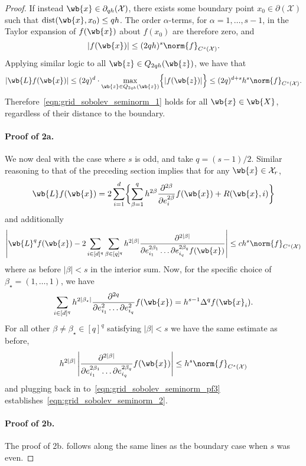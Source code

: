 \documentclass{article}
\newcommand{\abs}[1]{\left \lvert #1 \right \rvert}
\newcommand{\1}{\mathbf{1}}
\newcommand{\Xset}{\mathcal{X}}
\theoremstyle{alden}
\theoremstyle{aldenthm}
\theoremstyle{definition}
\theoremstyle{remark}
\begin{document}
\begin{proof}
	If instead $\wb{x} \in \partial_{qh}(\Xset)$, there exists some boundary point $x_0 \in \partial(\Xset)$ such that $\mathrm{dist}(\wb{x},x_0) \leq qh$. The order $\alpha$-terms, for $\alpha = 1,\ldots,s-1$, in the Taylor expansion of ${f}(\wb{x})$ about $f(x_0)$ are therefore zero, and
	\begin{equation*}
	\abs{f(\wb{x})} \leq (2qh)^s \norm{f}_{C^s(\Xset)}.
	\end{equation*}
	Applying similar logic to all $\wb{z} \in Q_{2qh}(\wb{z})$, we have that
	\begin{equation*}
	\abs{\wb{L}f(\wb{x})} \leq (2q)^d \cdot \max_{\wb{z} \in Q_{2qh}(\wb{z})} \Bigl\{\abs{f(\wb{z})}\Bigr\} \leq (2q)^{d + s} h^s \norm{f}_{C^s(\Xset)}.
	\end{equation*}
	Therefore~\eqref{eqn:grid_sobolev_seminorm_1} holds for all $\wb{x} \in \wb{X}$, regardless of their distance to the boundary.
	
	\paragraph{Proof of 2a.}
	We now deal with the case where $s$ is odd, and take $q = (s - 1)/2$. Similar reasoning to that of the preceding section implies that for any $\wb{x} \in \Xset_r$,
	\begin{equation*}
	\wb{L}f(\wb{x}) =  2\sum_{i = 1}^{d} \biggl\{\sum_{\beta = 1}^{q} h^{2\beta}\frac{\partial^{2\beta}}{\partial e_i^{2\beta}}f(\wb{x}) + R(\wb{x},i)\biggr\}
	\end{equation*}
	and additionally
	\begin{equation}
	\label{eqn:grid_sobolev_seminorm_pf3}
	\abs{\wb{L}^qf(\wb{x}) - 2 \sum_{i \in [d]^q} \sum_{\beta \in [q]^q} h^{2\abs{\beta}} \frac{\partial^{2\abs{\beta}}}{\partial e_{i_1}^{2\beta_1}\ldots \partial e_{i_q}^{2\beta_q} f(\wb{x})} } \leq c h^s\norm{f}_{C^s(\Xset)}
	\end{equation}
	where as before $\abs{\beta} < s$ in the interior sum. Now, for the specific choice of $\beta_{\star} = (1,\ldots,1)$, we have
	\begin{equation*}
	\sum_{i \in [d]^q} h^{2\abs{\beta_{\star}}} \frac{\partial^{2q}}{\partial e_{i_1}^{2}\ldots \partial e_{i_q}^{2}}f(\wb{x}) = h^{{s - 1}} \Delta^q f(\wb{x}_i).
	\end{equation*}
	For all other $\beta \neq \beta_{\star} \in [q]^q$ satisfying $\abs{\beta} < s$ we have the same estimate as before,
	\begin{equation*}
	h^{2\abs{\beta}} \abs{\frac{\partial^{2\abs{\beta}}}{\partial e_{i_1}^{2\beta_1}\ldots \partial e_{i_q}^{2\beta_q}} f(\wb{x})} \leq h^s \norm{f}_{C^s(\Xset)}
	\end{equation*}
	and plugging back in to~\eqref{eqn:grid_sobolev_seminorm_pf3} establishes~\eqref{eqn:grid_sobolev_seminorm_2}.
	
	\paragraph{Proof of 2b.}
	The proof of 2b. follows along the same lines as the boundary case when $s$ was even.
\end{proof}
\end{document}
